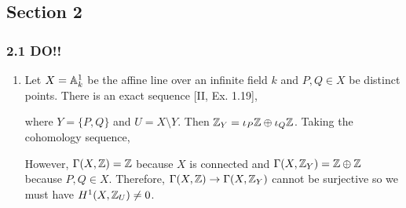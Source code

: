 \documentclass[12pt]{article}
\begin{document}
\subsection{Section 2}

\subsubsection{2.1 DO!!}

\begin{enumerate}
\item Let $X = \mathbb{A}^1_k$ be the affine line over an infinite field $k$ and $P, Q \in X$ be distinct points. There is an exact sequence [II, Ex. 1.19],
\begin{center}
\end{center}
where $Y = \{ P, Q \}$ and $U = X \setminus Y$. Then $\mathbb{Z}_Y = \iota_P \mathbb{Z} \oplus \iota_Q \mathbb{Z}$. Taking the cohomology sequence,
\begin{center}
\end{center}
However, $\Gamma(X, \mathbb{Z}) = \mathbb{Z}$ because $X$ is connected and $\Gamma(X, \mathbb{Z}_Y) = \mathbb{Z} \oplus \mathbb{Z}$ because $P, Q \in X$. Therefore, $\Gamma(X, \mathbb{Z}) \to \Gamma(X, \mathbb{Z}_Y)$ cannot be surjective so we must have $H^1(X, \mathbb{Z}_U) \neq 0$.


\end{enumerate}
\end{document}
